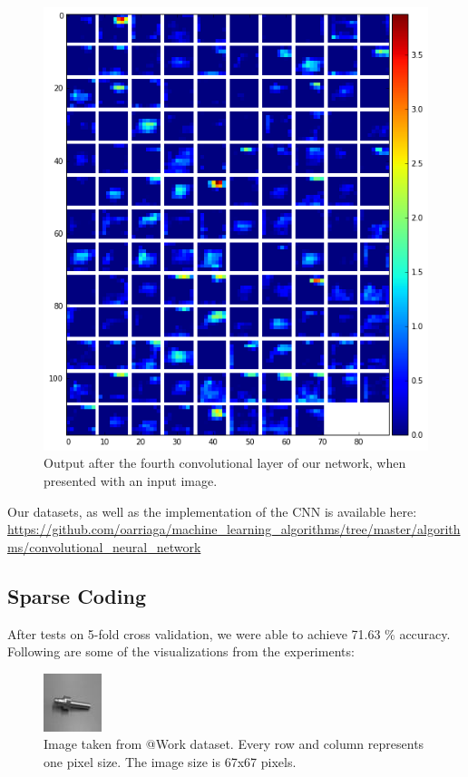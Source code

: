\documentclass[	DIV=calc,%
				paper=a4,%
				fontsize=11pt,%
				twocolumn]{scrartcl}	 %
\begin{document}
\begin{figure}[H]
    \centering
    \includegraphics[width=0.5\linewidth]{data/final_cnn_fourthlayer}
    \caption{Output after the fourth convolutional layer of our network, when presented with an input image.}
\end{figure}

Our datasets, as well as the implementation of the CNN is available here: \url{https://github.com/oarriaga/machine_learning_algorithms/tree/master/algorithms/convolutional_neural_network}


\subsection*{Sparse Coding}
After tests on 5-fold cross validation, we were able to achieve 71.63 \% accuracy. Following are some of the visualizations from the experiments:

\begin{figure}[H]
    \centering
    \includegraphics[width=0.3\linewidth]{data/sc_data/sc_atwork_image.jpg}
    \caption{Image taken from @Work dataset. Every row and column represents one pixel size. The image size is 67x67 pixels.}
    \label{sc_atwork_image}
\end{figure}
\end{document}
